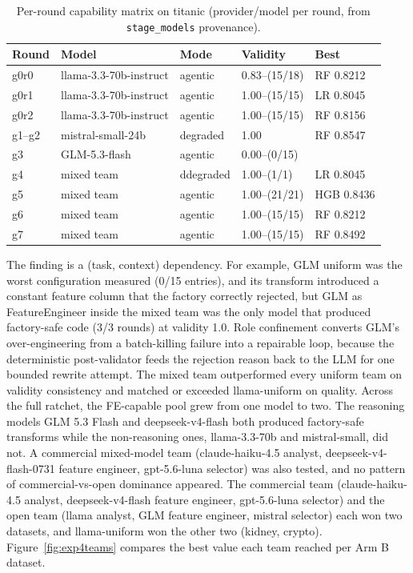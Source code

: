 \begin{table}[H]
\centering
\caption{Per-round capability matrix on titanic (provider/model per round, from \texttt{stage\_models} provenance).}
\label{tab:capability}
\small
\begin{tabular}{p{1.4cm}p{4.2cm}p{2.4cm}p{1.6cm}p{3.6cm}}
\toprule
\textbf{Round} & \textbf{Model} & \textbf{Mode} & \textbf{Validity} & \textbf{Best} \\
\midrule
g0r0 & llama-3.3-70b-instruct & agentic & 0.83--(15/18) & RF 0.8212 \\
g0r1 & llama-3.3-70b-instruct & agentic & 1.00--(15/15) & LR 0.8045 \\
g0r2 & llama-3.3-70b-instruct & agentic & 1.00--(15/15) & RF 0.8156 \\
g1--g2 & mistral-small-24b & degraded & 1.00 & RF 0.8547 \\
g3 & GLM-5.3-flash  & agentic & 0.00--(0/15) & \\
g4 & mixed team  & ddegraded & 1.00--(1/1) & LR 0.8045 \\
g5 & mixed team  & agentic & 1.00--(21/21) & HGB 0.8436 \\
g6 & mixed team  & agentic & 1.00--(15/15) & RF 0.8212 \\
g7 & mixed team  & agentic & 1.00--(15/15) & RF 0.8492 \\
\bottomrule
\end{tabular}
\end{table}

The finding is a (task, context) dependency. For example, GLM uniform was the worst configuration measured (0/15 entries), and its transform introduced a constant feature column that the factory correctly rejected, but GLM as FeatureEngineer inside the mixed team was the only model that produced factory-safe code (3/3 rounds) at validity 1.0. Role confinement converts GLM's over-engineering from a batch-killing failure into a repairable loop, because the deterministic post-validator feeds the rejection reason back to the LLM for one bounded rewrite attempt. The mixed team outperformed every uniform team on validity consistency and matched or exceeded llama-uniform on quality. Across the full ratchet, the FE-capable pool grew from one model to two. The reasoning models GLM 5.3 Flash and deepseek-v4-flash both produced factory-safe transforms while the non-reasoning ones, llama-3.3-70b and mistral-small, did not. A commercial mixed-model team (claude-haiku-4.5 analyst, deepseek-v4-flash-0731 feature engineer, gpt-5.6-luna selector) was also tested, and no pattern of commercial-vs-open dominance appeared. The commercial team (claude-haiku-4.5 analyst, deepseek-v4-flash feature engineer, gpt-5.6-luna selector) and the open team (llama analyst, GLM feature engineer, mistral selector) each won two datasets, and llama-uniform won the other two (kidney, crypto). Figure~\ref{fig:exp4teams} compares the best value each team reached per Arm B dataset.

